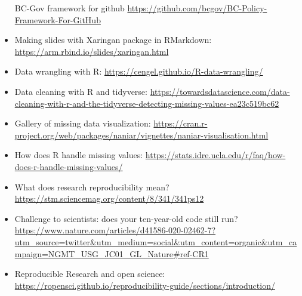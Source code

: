 \documentclass[
]{book}
\begin{document}
\begin{itemize}
  BC-Gov framework for github \url{https://github.com/bcgov/BC-Policy-Framework-For-GitHub}
\item
  Making slides with Xaringan package in RMarkdown: \url{https://arm.rbind.io/slides/xaringan.html}
\item
  Data wrangling with R: \url{https://cengel.github.io/R-data-wrangling/}
\item
  Data cleaning with R and tidyverse: \url{https://towardsdatascience.com/data-cleaning-with-r-and-the-tidyverse-detecting-missing-values-ea23c519bc62}
\item
  Gallery of missing data visualization: \url{https://cran.r-project.org/web/packages/naniar/vignettes/naniar-visualisation.html}
\item
  How does R handle missing values: \url{https://stats.idre.ucla.edu/r/faq/how-does-r-handle-missing-values/}
\item
  What does research reproducibility mean? \url{https://stm.sciencemag.org/content/8/341/341ps12}
\item
  Challenge to scientists: does your ten-year-old code still run? \url{https://www.nature.com/articles/d41586-020-02462-7?utm_source=twitter\&utm_medium=social\&utm_content=organic\&utm_campaign=NGMT_USG_JC01_GL_Nature\#ref-CR1}
\item
  Reproducible Research and open science: \url{https://ropensci.github.io/reproducibility-guide/sections/introduction/}
\end{itemize}
\end{document}
